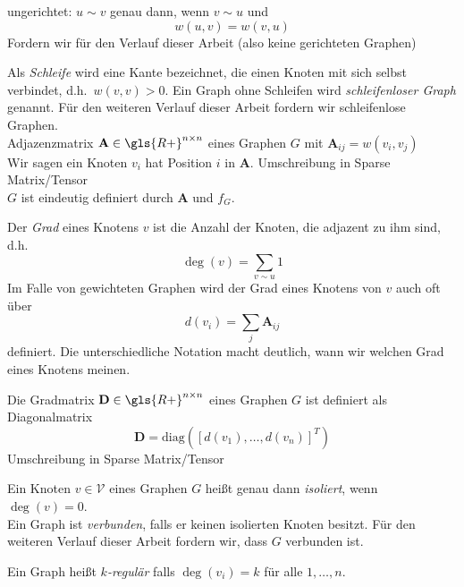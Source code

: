 ungerichtet:
$u \sim v$ genau dann, wenn $v \sim u$ und
\begin{equation}
  w\left(u, v\right) = w\left(v, u\right)
\end{equation}
Fordern wir für den Verlauf dieser Arbeit (also keine gerichteten Graphen)

Als \emph{Schleife} wird eine Kante bezeichnet, die einen Knoten mit sich selbst verbindet, d.h.\ $w\left(v, v\right) > 0$.
Ein Graph ohne Schleifen wird \emph{schleifenloser Graph} genannt.
Für den weiteren Verlauf dieser Arbeit fordern wir schleifenlose Graphen.\\

Adjazenzmatrix $\mathbf{A} \in \gls{R+}^{n \times n}$ eines Graphen $G$ mit $\mathbf{A}_{ij} = w(v_i, v_j)$\\
Wir sagen ein Knoten $v_i$ hat Position $i$ in $\mathbf{A}$.
Umschreibung in Sparse Matrix/Tensor\\

$G$ ist eindeutig definiert durch $\mathbf{A}$ und $f_G$.

Der \emph{Grad} eines Knotens $v$ ist die Anzahl der Knoten, die adjazent zu ihm sind, d.h.
\begin{equation}
  \deg\left(v\right) = \sum_{v \sim u} 1
\end{equation}
Im Falle von gewichteten Graphen wird der Grad eines Knotens von $v$ auch oft über
\begin{equation}
  d\left(v_i\right) = \sum_{j} \mathbf{A}_{ij}
\end{equation}
definiert.
Die unterschiedliche Notation macht deutlich, wann wir welchen Grad eines Knotens meinen.

Die Gradmatrix $\mathbf{D} \in \gls{R+}^{n \times n}$ eines Graphen $G$ ist definiert als Diagonalmatrix
\begin{equation}
  \mathbf{D} = \text{diag}\left( {\left[ d\left(v_1\right), \ldots, d\left(v_n\right) \right]}^T \right)
\end{equation}
Umschreibung in Sparse Matrix/Tensor

Ein Knoten $v \in \mathcal{V}$ eines Graphen $G$ heißt genau dann \emph{isoliert}, wenn $\deg\left(v\right) = 0$.\\
Ein Graph ist \emph{verbunden}, falls er keinen isolierten Knoten besitzt.
Für den weiteren Verlauf dieser Arbeit fordern wir, dass $G$ verbunden ist.\

Ein Graph heißt \emph{$k$-regulär} falls $\deg\left(v_i\right) = k$ für alle $1, \ldots, n$.

